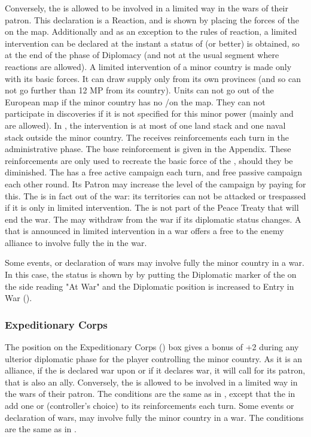 Conversely, the \MIN is allowed to be involved in a limited way in the wars of
their patron. This declaration is a Reaction, and is shown by placing the
forces of the \MIN on the map. Additionally and as an exception to the rules
of reaction, a limited intervention can be declared at the instant a status of
\AM (or better) is obtained, so at the end of the phase of Diplomacy (and not
at the usual segment where reactions are allowed).
\bparag A limited intervention of a minor country is made only with its basic
forces. It can draw supply only from its own provinces (and so can not go
further than 12 MP from its country).
\bparag Units can not go out of the European map if the minor country has no
\TP/\COL on the \ROTW map. They can not participate in discoveries if it is
not specified for this minor power (mainly  and 
are allowed).
\bparag In \AM, the intervention is at most of one land stack and one naval
stack outside the minor country.
\bparag The \MIN receives reinforcements each turn in the administrative
phase. The base reinforcement is given in the Appendix. These reinforcements
are only used to recreate the basic force of the \MIN, should they be
diminished.
\bparag The \MIN has a free active campaign each turn, and free passive
campaign each other round. Its Patron may increase the level of the campaign
by paying for this.
\bparag The \MIN is in fact out of the war: its territories can not be
attacked or trespassed if it is only in limited intervention.  The \MIN is not
part of the Peace Treaty that will end the war. The \MIN may withdraw from the
war if its diplomatic status changes.
\bparag A \MIN that is announced in limited intervention in a war offers a
free \CB to the enemy alliance to involve fully the \MIN in the war.

 Some events, or declaration of wars may
involve fully the minor country in a war.
\bparag In this case, the status is shown by by putting the Diplomatic marker
of the \MIN on the side reading "At War" and the Diplomatic position is
increased to Entry in War (\EW).


\subsubsection{Expeditionary Corps}
\aparag The position on the Expeditionary Corps (\CE) box gives a bonus of +2
during any ulterior diplomatic phase for the player controlling the minor
country.
\aparag[Alliance.] As it is an alliance, if the \MIN is declared war upon or
if it declares war, it will call for its patron, that is also an ally.
Conversely, the \MIN is allowed to be involved in a limited way in the wars of
their patron. The conditions are the same as in \AM, except that the \MIN in
\CE add one \LD or \ND (controller's choice) to its reinforcements each turn.
 Some events or declaration of wars, may
involve fully the minor country in a war.  The conditions are the same as in
\AM.


